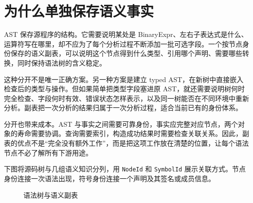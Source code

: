 \section{为什么单独保存语义事实}
AST 保存源程序的结构。它需要说明某处是 BinaryExpr、左右子表达式是什么、运算符写在哪里，却不应为了每个分析过程不断添加一批可选字段。一个按节点身份保存的语义副表，可以说明这个节点得到什么类型、引用哪个声明、需要哪些转换，同时保持语法树的含义稳定。

这种分开不是唯一正确方案。另一种方案是建立 typed AST，在新树中直接嵌入检查后的类型与操作。但如果简单把类型字段塞进原 AST，就还需要说明树何时完全检查、字段何时有效、错误状态怎样表示，以及同一树能否在不同环境中重新分析。副表把一次分析的结果归属于一次分析过程，适合当前已有的身份体系。

分开也带来成本。AST 与事实之间需要可靠身份，事实应完整对应节点，两个对象的寿命需要协调。查询需要索引，构造成功结果时需要检查关联关系。因此，副表的优点不是“完全没有额外工作”，而是把这项工作放在清楚的位置，让每个语法节点不必了解所有下游用途。

下图将源码树与几组语义知识分列，用 \texttt{NodeId} 和 \texttt{SymbolId} 展示关联方式。节点身份连接一次语法出现，符号身份连接一个声明及其签名或成员信息。
\begin{figure}[htbp]
\centering
{}
\caption{语法树与语义副表}
\end{figure}

